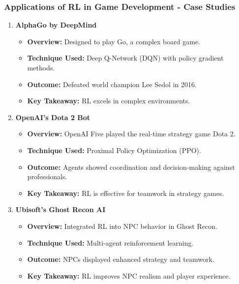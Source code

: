 \documentclass[aspectratio=169]{beamer}
\begin{document}
\begin{frame}[fragile]
    \frametitle{Applications of RL in Game Development - Case Studies}
    \begin{enumerate}
        \item \textbf{AlphaGo by DeepMind}
            \begin{itemize}
                \item \textbf{Overview:} Designed to play Go, a complex board game.
                \item \textbf{Technique Used:} Deep Q-Network (DQN) with policy gradient methods.
                \item \textbf{Outcome:} Defeated world champion Lee Sedol in 2016.
                \item \textbf{Key Takeaway:} RL excels in complex environments.
            \end{itemize}

        \item \textbf{OpenAI's Dota 2 Bot}
            \begin{itemize}
                \item \textbf{Overview:} OpenAI Five played the real-time strategy game Dota 2.
                \item \textbf{Technique Used:} Proximal Policy Optimization (PPO).
                \item \textbf{Outcome:} Agents showed coordination and decision-making against professionals.
                \item \textbf{Key Takeaway:} RL is effective for teamwork in strategy games.
            \end{itemize}

        \item \textbf{Ubisoft's Ghost Recon AI}
            \begin{itemize}
                \item \textbf{Overview:} Integrated RL into NPC behavior in Ghost Recon.
                \item \textbf{Technique Used:} Multi-agent reinforcement learning.
                \item \textbf{Outcome:} NPCs displayed enhanced strategy and teamwork.
                \item \textbf{Key Takeaway:} RL improves NPC realism and player experience.
            \end{itemize}
    \end{enumerate}
\end{frame}
\end{document}
